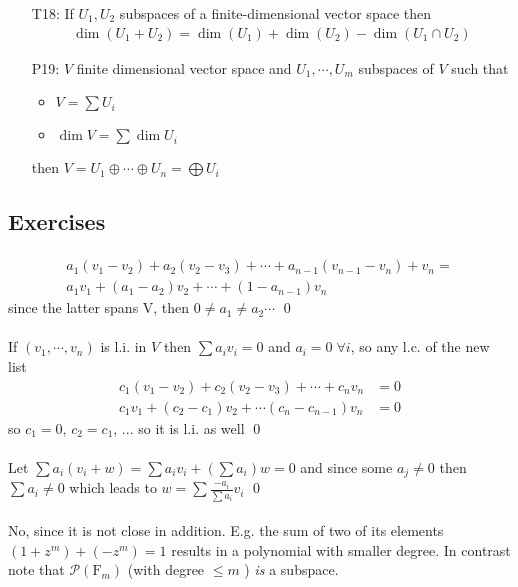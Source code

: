 \documentclass[11pt,notitlepage,oneside]{article}
\DeclareMathOperator{\dimension}{dim}
\newcommand{\exo}[1]{%
\addtocontents{toc}{\protect\setcounter{tocdepth}{2}}%
\paragraph{#1}}
\begin{document}
\begin{itemize}
%
\item[T18:\label{it:T2_18}] If $U_1,U_2$ subspaces of a finite-dimensional vector space then 
\begin{align*}
\dimension(U_1+U_2)=\dimension(U_1)+\dimension(U_2) - \dimension(U_1\cap U_2)
\end{align*}
\item[P19:\label{it:T2_19}] $V$ finite dimensional vector space and $U_1,\cdots,U_m$ subspaces of $V$ such that 
\begin{itemize}
  \item $V=\sum U_i$
  \item $\dimension{V}=\sum\dimension{U_i}$
\end{itemize}
 then $V=U_1 \oplus \cdots \oplus U_n = \bigoplus U_i$
\end{itemize}



\subsection*{Exercises}
\exo{}
\begin{align*}
a_1(v_1 - v_2) + a_2 (v_2 - v_3) + \cdots + a_{n-1} (v_{n-1} - v_n) + v_n = \\
a_1 v_1 + (a_1 - a_2) v_2 + \cdots + (1 - a_{n-1}) v_n 
\end{align*}
since the latter spans V, then $0 \neq a_1\neq a_2 \cdots$ 
\qed

\exo{} If $(v_1,\cdots,v_n)$ is l.i. in $V$ then $\sum a_i v_i = 0$ and $a_i = 0\; \forall i$, so any l.c. of the new list 
\begin{align*}
  c_1 (v_1 - v_2) + c_2 (v_2 - v_3) + \cdots + c_n v_n &= 0\\
  c_1 v_1 + (c_2 - c_1) v_2 + \cdots (c_n - c_{n-1})v_n &= 0
\end{align*}
so $c_1=0$, $c_2 = c_1$, ...  so it is l.i. as well \qed
\exo{} Let $\sum a_i (v_i + w) = \sum a_i v_i + (\sum a_i) w = 0$ and since some $a_j\neq 0$ then $\sum a_i\neq 0$ 
which leads to $w = \sum \frac{-a_i}{\sum a_i} v_i$ \qed 

\exo{} No, since it is not close in addition. E.g. the sum of two of its elements $ (1 + z^m) + (- z^m) = 1  $ 
results in a polynomial with smaller degree. In contrast note that $\mathcal{P}(\mathrm{F}_m)$ (with degree $\leq m$ ) 
\emph{is} a subspace. 
\end{document}
